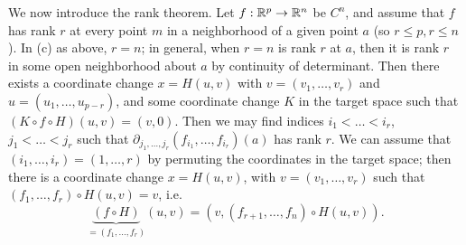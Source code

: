 We now introduce the rank theorem. Let $f : \mathbb R^p \to \mathbb R^n$ be $C^n$, and assume that $f$ has rank $r$ at every point $m$ in a neighborhood of a given point $a$ (so $r \leq p, r \leq n$). In (c) as above, $r = n$; in general, when $r = n$ is rank $r$ at $a$, then it is rank $r$ in some open neighborhood about $a$ by continuity of determinant. Then there exists a coordinate change $x = H(u, v)$ with $v = (v_1, \dots, v_r)$ and $u = (u_1, \dots, u_{p-r})$, and some coordinate change $K$ in the target space such that $(K \circ f \circ H)(u, v) = (v, 0)$. Then we may find indices $i_1 < \dots < i_r$, $j_1 < \dots < j_r$ such that $\partial_{j_1, \dots, j_r}(f_{i_1}, \dots, f_{i_r}) (a)$ has rank $r$. We can assume that $(i_1, \dots, i_r) = (1, \dots, r)$ by permuting the coordinates in the target space; then there is a coordinate change $x = H(u, v)$, with $v = (v_1, \dots, v_r)$ such that $(f_1, \dots, f_r) \circ H(u, v) = v$, i.e.
\[ \underbrace{(f \circ H)}_{= (f_1, \dots, f_r)} (u, v) = (v, (f_{r+1}, \dots, f_n) \circ H(u, v)). \]